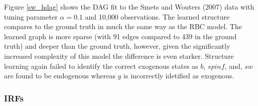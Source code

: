 \documentclass{article}
\begin{document}
Figure \ref{sw_hdag} shows the DAG fit to the Smets and Wouters (2007) data with tuning parameter $\alpha = 0.1$ and 10,000 observations. The learned structure compares to the ground truth in much the same way as the RBC model. The learned graph is more sparse (with 91 edges compared to 439 in the ground truth) and deeper than the ground truth, however, given the significantly increased complexity of this model the difference is even starker. Structure learning again failed to identify the correct exogenous states as $b$, $spinf$, and, $sw$ are found to be endogenous whereas $y$ is incorrectly idetified as exogenous. 

\subsubsection{IRFs}
\end{document}
